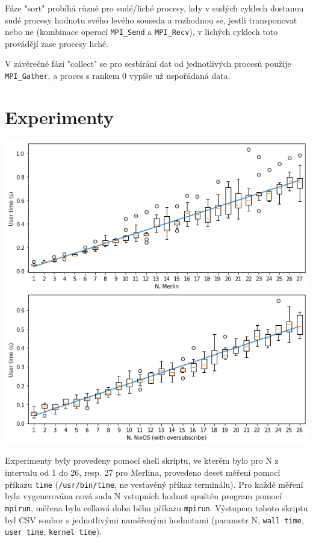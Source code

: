 \documentclass[11pt]{article}
\begin{document}
Fáze "sort" probíhá různě pro sudé/liché procesy, kdy v sudých cyklech dostanou
sudé procesy hodnotu svého levého souseda a rozhodnou se, jestli transponovat
nebo ne (kombinace operací \texttt{MPI\_Send} a \texttt{MPI\_Recv}), v lichých cyklech toto
provádějí zase procesy liché.

V závěrečné fázi "collect" se pro sesbírání dat od jednotlivých procesů použije
\texttt{MPI\_Gather}, a proces s rankem 0 vypíše už uspořádaná data.

\section{Experimenty}
\label{sec:org4bcccb7}
\begin{center}
\includegraphics[width=.9\linewidth]{./.ob-jupyter/10773b02fdc9c6bbbe7ad2653184b22029124297.png}
\end{center}

Experimenty byly provedeny pomocí shell skriptu, ve kterém bylo pro N z
intervalu od 1 do 26, resp. 27 pro Merlina, provedeno deset měření pomocí
příkazu \texttt{time} (\texttt{/usr/bin/time}, ne vestavěný příkaz terminálu). Pro každé měření
byla vygenerována nová sada N vstupních hodnot spuštěn program pomocí \texttt{mpirun},
měřena byla celková doba běhu příkazu \texttt{mpirun}. Výstupem tohoto skriptu byl CSV
soubor s jednotlivými naměřenými hodnotami (parametr N, \texttt{wall time}, \texttt{user time},
\texttt{kernel time}).
\end{document}
